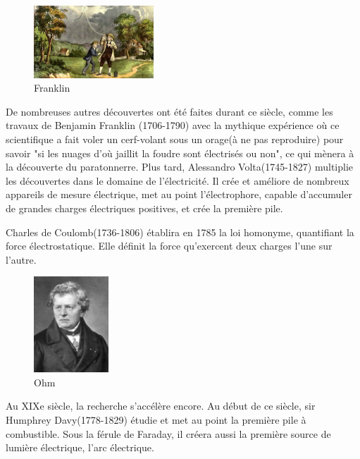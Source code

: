 \documentclass[12pt]{report}
\begin{document}
\begin{figure}
  \begin{center}
    \includegraphics[width=0.4\textwidth]{franklin}
  \end{center}
  \caption{Franklin}
\end{figure}
De nombreuses autres découvertes ont été faites durant ce siècle, comme les travaux de Benjamin Franklin (1706-1790) avec la mythique expérience où ce scientifique a fait voler un cerf-volant sous un orage(à ne pas reproduire) pour savoir "si les nuages d'où jaillit la foudre sont électrisés ou non", ce qui mènera à la découverte du paratonnerre. Plus tard, Alessandro Volta(1745-1827) multiplie les découvertes dans le domaine de l'électricité. Il crée et améliore de nombreux appareils de mesure électrique, met au point l'électrophore, capable d'accumuler de grandes charges électriques positives, et crée la première pile.

Charles de Coulomb(1736-1806) établira en 1785 la loi homonyme, quantifiant la force électrostatique. Elle définit la force qu'exercent deux charges l'une sur l'autre.
\begin{figure}
  \begin{center}
    \includegraphics[width=0.25\textwidth]{ohm}
  \end{center}
  \caption{Ohm}
\end{figure}

Au XIXe siècle, la recherche s'accélère encore. Au début de ce siècle, sir Humphrey Davy(1778-1829) étudie et met au point la première pile à combustible. Sous la férule de Faraday, il créera aussi la première source de lumière électrique, l'arc électrique.
\end{document}
